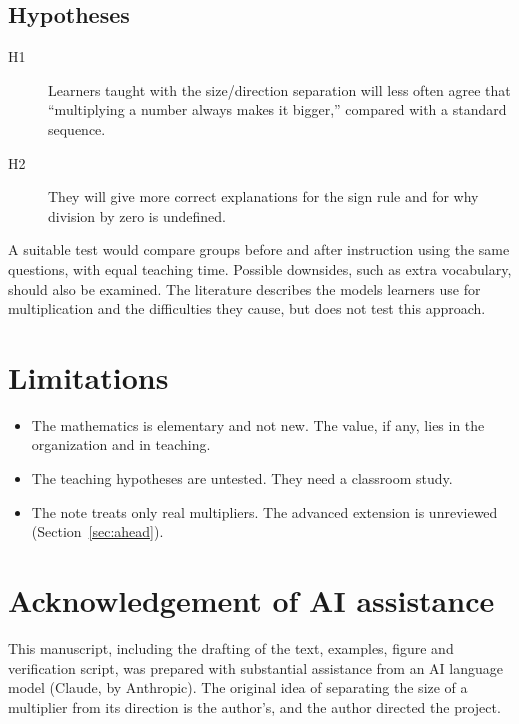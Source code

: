 \documentclass[12pt]{article}
\theoremstyle{definition}
\theoremstyle{remark}
\begin{document}
\subsection{Hypotheses}
\begin{description}
\item[H1] Learners taught with the size/direction separation will less often agree that ``multiplying a number always makes it bigger,'' compared with a standard sequence.
\item[H2] They will give more correct explanations for the sign rule and for why division by zero is undefined.
\end{description}
A suitable test would compare groups before and after instruction using the same questions, with equal teaching time. Possible downsides, such as extra vocabulary, should also be examined. The literature \cite{fischbein1985,greer1992} describes the models learners use for multiplication and the difficulties they cause, but does not test this approach.

\section{Limitations}
\begin{itemize}
\item The mathematics is elementary and not new. The value, if any, lies in the organization and in teaching.
\item The teaching hypotheses are untested. They need a classroom study.
\item The note treats only real multipliers. The advanced extension is unreviewed (Section~\ref{sec:ahead}).
\end{itemize}

\section*{Acknowledgement of AI assistance}
This manuscript, including the drafting of the text, examples, figure and verification script, was prepared with substantial assistance from an AI language model (Claude, by Anthropic). The original idea of separating the size of a multiplier from its direction is the author's, and the author directed the project.



\end{document}
